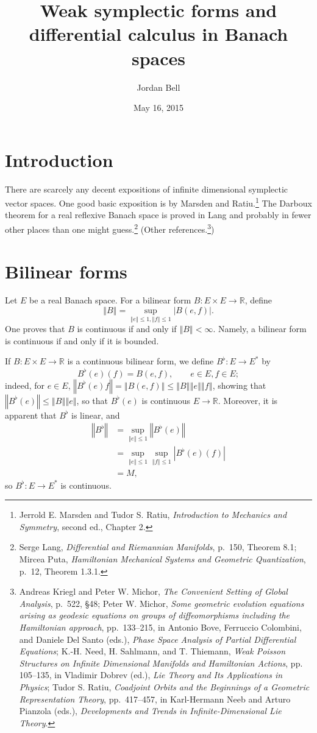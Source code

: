 \documentclass{article}
\newcommand{\norm}[1]{\left\Vert #1 \right\Vert}
\theoremstyle{definition}
\begin{document}
\title{Weak symplectic forms and differential calculus in Banach spaces}
\author{Jordan Bell}
\date{May 16, 2015}

\maketitle

\section{Introduction}
There are scarcely any decent expositions of infinite dimensional symplectic vector spaces. One good basic exposition
is by Marsden and Ratiu.\footnote{Jerrold E. Marsden and Tudor S. Ratiu, {\em Introduction to Mechanics and Symmetry}, second ed.,
Chapter 2.} The Darboux theorem for a real reflexive Banach space is proved in Lang and probably in fewer other places than one might
guess.\footnote{Serge Lang,
{\em Differential and Riemannian Manifolds}, p.~150, Theorem 8.1;
Mircea Puta, {\em Hamiltonian Mechanical Systems and Geometric Quantization}, p.~12, Theorem 1.3.1.}
(Other references.\footnote{Andreas Kriegl and Peter W. Michor, {\em The Convenient Setting of Global Analysis}, p.~522, \S 48;
Peter W. Michor,
{\em Some geometric evolution equations arising as geodesic equations on groups of diffeomorphisms including the Hamiltonian approach},
pp.~133--215, in
Antonio Bove, Ferruccio Colombini, and Daniele Del Santo (eds.), {\em Phase Space Analysis of Partial Differential Equations};
K.-H. Need, H. Sahlmann, and T. Thiemann, {\em Weak Poisson Structures on Infinite Dimensional Manifolds
and Hamiltonian Actions}, pp. 105--135, in Vladimir Dobrev (ed.), {\em Lie Theory and Its Applications in Physics};
Tudor S. Ratiu, {\em Coadjoint Orbits and the Beginnings of a Geometric Representation Theory}, pp.~417--457, in 
Karl-Hermann Neeb and Arturo Pianzola (eds.), {\em Developments and Trends in Infinite-Dimensional Lie Theory}.})


\section{Bilinear forms}
Let $E$ be a real Banach space. For a bilinear form $B:E \times E \to \mathbb{R}$, define
\[
\norm{B} = \sup_{\norm{e} \leq 1, \norm{f} \leq 1} |B(e,f)|.
\]
One proves that $B$ is continuous if and only if $\norm{B}<\infty$. Namely, a bilinear form is continuous if and only if it is bounded.

If $B:E \times E \to \mathbb{R}$ is a continuous bilinear form,
we define 
$B^\flat:E \to E^*$ by
\[
B^\flat(e)(f) = B(e,f), \qquad e \in E, f \in E;
\]
indeed, for $e \in E$, $\norm{B^\flat(e)f} = \norm{B(e,f)} \leq \norm{B} \norm{e} \norm{f}$, showing that
$\norm{B^\flat(e)} \leq \norm{B} \norm{e}$, so that
$B^\flat(e)$ is continuous $E \to \mathbb{R}$. Moreover, it is apparent that $B^\flat$ is linear, and
\begin{align*}
\norm{B^\flat}&=\sup_{\norm{e} \leq 1} \norm{B^\flat(e)}\\
&=\sup_{\norm{e} \leq 1} \sup_{\norm{f} \leq 1} |B^\flat(e)(f)|\\
&=M,
\end{align*}
so $B^\flat:E \to E^*$ is continuous. 
\end{document}
